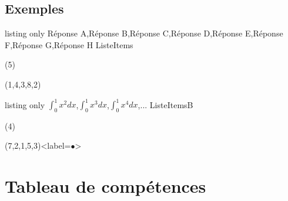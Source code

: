 \documentclass[french,11pt,a4paper]{article}
\begin{document}
\subsection{Exemples}

\begin{DemoCode}{listing only}
\CreerListeItems%
    {Réponse A,Réponse B,Réponse C,Réponse D,Réponse E,Réponse F,Réponse G,Réponse H}%
    {\malisteditems}{ListeItems}
\end{DemoCode}


\begin{DemoCode}{}
(5)
\end{DemoCode}

\begin{DemoCode}{}
(1,4,3,8,2)
\end{DemoCode}

\begin{DemoCode}{listing only}
\CreerListeItems%
    {{$\int_0^1 x^2 dx$},{$\int_0^1 x^3 dx$},{$\int_0^1 x^4 dx$},...}%
    {\malisteditemsb}{ListeItemsB}
\end{DemoCode}


\begin{DemoCode}{}
(4)
\end{DemoCode}

\begin{DemoCode}{}
(7,2,1,5,3)<label=$\bullet$>
\end{DemoCode}

\pagebreak

\section{Tableau de compétences}
\end{document}
